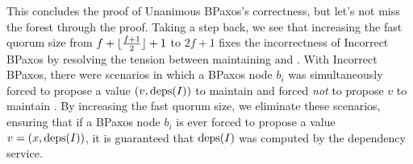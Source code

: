 This concludes the proof of Unanimous BPaxos's correctness, but let's not miss
the forest through the proof. Taking a step back, we see that increasing the
fast quorum size from $f + \lfloor\frac{f + 1}{2}\rfloor + 1$ to $2f + 1$ fixes the incorrectness of
Incorrect BPaxos by resolving the tension between maintaining
 and .  With Incorrect
BPaxos, there were scenarios in which a BPaxos node $b_i$ was simultaneously
forced to propose a value $(v, \text{deps}(I))$ to maintain
 and forced \emph{not} to propose $v$ to maintain
.  By increasing the fast quorum size, we eliminate
these scenarios, ensuring that if a BPaxos node $b_i$ is ever forced to propose
a value $v = (x, \text{deps}(I))$, it is guaranteed that $\text{deps}(I)$ was computed by
the dependency service.
